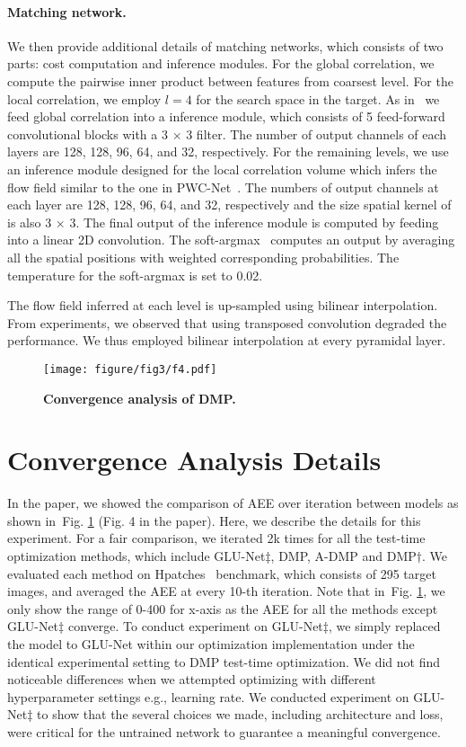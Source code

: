 \documentclass[10pt,twocolumn,letterpaper]{article}
\newcommand{\figref}[1]{Fig. \ref{#1}}
\begin{document}
\paragraph{Matching network.} We then provide additional details of matching networks, which consists of two parts: cost computation and inference modules. For the global correlation, we compute the pairwise inner product between features from coarsest level. For the local correlation, we employ $l=4$ for the search space in the target. As in~\cite{melekhov2019dgc,truong2020glu} we feed global correlation into a inference module, which consists of 5 feed-forward convolutional blocks with a 3 $\times$ 3 filter. The number of output channels of each layers are 128, 128, 96, 64, and 32, respectively. For the remaining levels, we use an inference module designed for the local correlation volume which infers the flow field similar to the one in PWC-Net~\cite{sun2018pwc}. The numbers of output channels at each layer are 128, 128, 96, 64, and 32, respectively and the size spatial kernel of is also 3 $\times$ 3. The final output of the inference module is computed by feeding into a linear 2D convolution. The soft-argmax~\cite{kendall2017end} computes an output by averaging all the spatial positions with weighted corresponding probabilities. The temperature for the soft-argmax is set to 0.02. 

The flow field inferred at each level is up-sampled using bilinear interpolation. From experiments, we observed that using transposed convolution degraded the performance. We thus employed bilinear interpolation at every pyramidal layer.  
\begin{figure}
	\centering
\texttt{[image: figure/fig3/f4.pdf]}
  \caption{\textbf{Convergence analysis of DMP.}}\vspace{-10pt}\label{fig2:supp}
\end{figure}

\section{Convergence Analysis Details}\label{sec:2}
In the paper, we showed the comparison of AEE over iteration between models as shown in~\figref{fig2:supp} (Fig. 4 in the paper). 
Here, we describe the details for this experiment. For a fair comparison, we iterated 2k times for all the test-time optimization methods, which include GLU-Net$\ddagger$, DMP, A-DMP and DMP$\dagger$. We evaluated each method on Hpatches~\cite{balntas2017hpatches} benchmark, which consists of 295 target images, and averaged the AEE at every 10-th iteration. Note that in~\figref{fig2:supp}, we only show the range of 0-400 for x-axis as the AEE for all the methods except GLU-Net$\ddagger$ converge. To conduct experiment on GLU-Net$\ddagger$, we simply replaced the model to GLU-Net within our optimization implementation under the identical experimental setting to DMP test-time optimization. We did not find noticeable differences when we attempted optimizing with different hyperparameter settings e.g., learning rate. We conducted experiment on GLU-Net$\ddagger$ to show that the several choices we made, including architecture and loss, were critical for the untrained network to guarantee a meaningful convergence.
\end{document}
